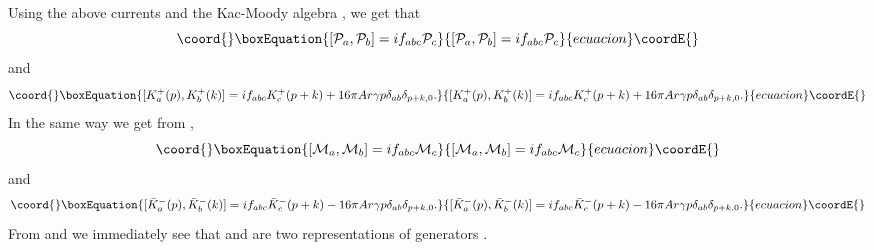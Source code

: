 \documentclass[a4paper,12pt]{article}
\begin{document}
Using the above currents and  the Kac-Moody algebra \coordHE{} , we get that
\begin{equation}\coord{}\boxEquation{
[{\cal P}_a,{\cal P}_b]=if_{abc}{\cal P}_c
}{
[{\cal P}_a,{\cal P}_b]=if_{abc}{\cal P}_c
}{ecuacion}\coordE{}\end{equation}
and
\begin{equation}\coord{}\boxEquation{
[ K^{+}_a(p) , K^{+}_b(k) ]=if_{abc}K^{+}_{c}(p+k) + 
16{\pi}Ar{\gamma}p{\delta}_{ab}{\delta}_{p+k,0}.
}{
[ K^{+}_a(p) , K^{+}_b(k) ]=if_{abc}K^{+}_{c}(p+k) + 
16{\pi}Ar{\gamma}p{\delta}_{ab}{\delta}_{p+k,0}.
}{ecuacion}\coordE{}\end{equation}
In the same way we get from \coordHE{} ,
\begin{equation}\coord{}\boxEquation{
[{\cal M}_a,{\cal M}_b]=if_{abc}{\cal M}_c
}{
[{\cal M}_a,{\cal M}_b]=if_{abc}{\cal M}_c
}{ecuacion}\coordE{}\end{equation}
and
\begin{equation}\coord{}\boxEquation{
[ {\bar{K}}^{-}_a(p) , {\bar{K}}^{-}_b(k) ]=if_{abc}{\bar{K}}^{-}_{c}(p+k) - 
16{\pi}Ar{\gamma}p{\delta}_{ab}{\delta}_{p+k,0}.
}{
[ {\bar{K}}^{-}_a(p) , {\bar{K}}^{-}_b(k) ]=if_{abc}{\bar{K}}^{-}_{c}(p+k) - 
16{\pi}Ar{\gamma}p{\delta}_{ab}{\delta}_{p+k,0}.
}{ecuacion}\coordE{}\end{equation}
From \coordHE{} and \coordHE{} we immediately 
see that \coordHE{} and \coordHE{} 
are two representations of \coordHE{} generators .
 
\end{document}
